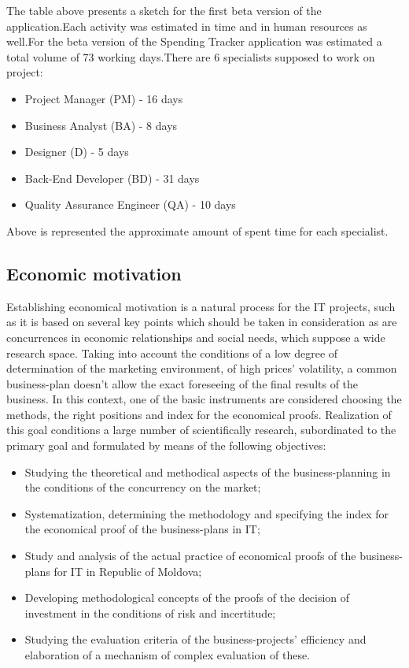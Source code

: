 The table above presents a sketch for the first beta version of the application.Each activity was estimated in time and in human resources as well.For the beta version of the Spending Tracker application was estimated a total volume of 73 working days.There are 6 specialists supposed to work on project:
\begin{itemize}
	\item Project Manager (PM) - 16 days
	\item Business Analyst (BA) - 8 days
	\item Designer (D) - 5 days
	\item Back-End Developer (BD) - 31 days
	\item Quality Assurance Engineer (QA) - 10 days
\end{itemize}
Above is represented the approximate amount of spent time for each specialist.
\subsection{Economic motivation}
Establishing economical motivation is a natural process for the IT projects, such as it is based on several key points which should be taken in consideration as are concurrences in economic relationships and social needs, which suppose  a wide research space. Taking into account the conditions of a low degree of determination of the marketing environment, of high prices’ volatility, a common business-plan doesn’t allow the exact foreseeing of the final results of the business. In this context, one of the basic instruments are considered choosing the methods, the right positions and index for the economical proofs. Realization of this goal conditions a large number of scientifically research, subordinated to the primary goal and formulated by means of the following objectives:
\begin{itemize}
	\item  Studying the theoretical and methodical aspects of the business-planning in the conditions of the concurrency on the market;
	\item Systematization, determining the methodology and specifying the index for the economical proof of the business-plans in IT;
	\item Study and analysis of the actual practice of economical proofs of the business-plans for IT in Republic of Moldova;
	\item Developing methodological concepts of the proofs of the decision of investment in the conditions of risk and incertitude;
	\item Studying the evaluation criteria of the business-projects’ efficiency and elaboration of a mechanism of complex evaluation of these.
\end{itemize}
